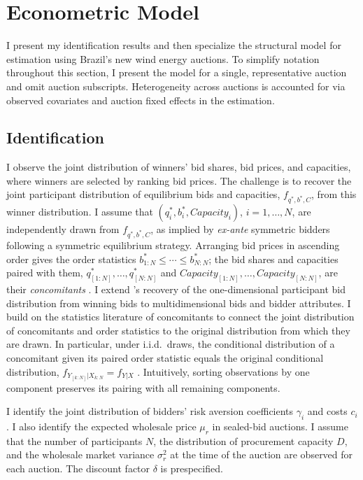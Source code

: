 \documentclass[12pt]{article}
\theoremstyle{definition} %
\begin{document}
\section{Econometric Model}
\label{sec:econometric}

I present my identification results and then specialize the structural model for estimation using Brazil's new wind energy auctions. To simplify notation throughout this section, I present the model for a single, representative auction and omit auction subscripts. Heterogeneity across auctions is accounted for via observed covariates and auction fixed effects in the estimation.

\subsection{Identification}
\label{sec:identification}

I observe the joint distribution of winners' bid shares, bid prices, and capacities, where winners are selected by ranking bid prices. The challenge is to recover the joint participant distribution of equilibrium bids and capacities, $f_{q^\ast,b^\ast,C}$, from this winner distribution. I assume that $(q_i^\ast,b_i^\ast,Capacity_i)$, $i=1,\dots,N$, are independently drawn from $f_{q^\ast,b^\ast,C}$, as implied by \textit{ex-ante} symmetric bidders following a symmetric equilibrium strategy. Arranging bid prices in ascending order gives the order statistics $b_{1:N}^\ast\leq\cdots\leq b_{N:N}^\ast$; the bid shares and capacities paired with them, $q_{[1:N]}^\ast,\dots,q_{[N:N]}^\ast$ and $Capacity_{[1:N]},\dots,Capacity_{[N:N]}$, are their \textit{concomitants} \citep{Yang1977}. I extend \citet{Athey2002}'s recovery of the one-dimensional participant bid distribution from winning bids to multidimensional bids and bidder attributes. I build on the statistics literature of concomitants to connect the joint distribution of concomitants and order statistics to the original distribution from which they are drawn. In particular, under i.i.d.\ draws, the conditional distribution of a concomitant given its paired order statistic equals the original conditional distribution, $f_{Y_{[k:N]}|X_{k:N}}=f_{Y|X}$ \citep{Yang1977}. Intuitively, sorting observations by one component preserves its pairing with all remaining components.

I identify the joint distribution of bidders' risk aversion coefficients $\gamma_i $ and costs $c_i $. I also identify the expected wholesale price $\mu_r $ in sealed-bid auctions. I assume that the number of participants $N$, the distribution of procurement capacity $D$, and the wholesale market variance $\sigma_r^2$ at the time of the auction are observed for each auction. The discount factor $\delta$ is prespecified.
\end{document}
